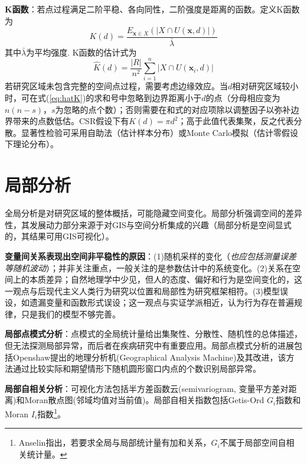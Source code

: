 \par \textbf{K函数}：若点过程满足二阶平稳、各向同性，二阶强度是距离的函数。定义K函数为
\begin{equation}
    K(d)=\frac{E_{\mathbf{x}\in X}(\vert X\cap U(\mathbf{x},d)\vert )}{\bar{\lambda}}
\end{equation}
其中$\bar{\lambda}$为平均强度. K函数的估计式为
\begin{equation}
    \hat{K}(d)=\frac{\vert R \vert}{n^2}\sum_{i=1}^n \vert X\cap U(\mathbf{x}_i,d)\vert
    \label{eq:hatK}
\end{equation}
若研究区域未包含完整的空间点过程，需要考虑边缘效应。当$d$相对研究区域较小时，可在式(\ref{eq:hatK})的求和号中忽略到边界距离小于$d$的点（分母相应变为$n(n-s)$，$s$为忽略的点个数）；否则需要在和式的对应项除以调整因子以弥补边界带来的点数低估。CSR假设下有$K(d)=\pi d^2$；高于此值代表集聚，反之代表分散。显著性检验可采用自助法（估计样本分布）或Monte Carlo模拟（估计零假设下理论分布）。


\section{局部分析}

\par 全局分析是对研究区域的整体概括，可能隐藏空间变化。局部分析强调空间的差异性，其发展动力部分来源于对GIS与空间分析集成的兴趣（局部分析是空间显式的，其结果可用GIS可视化）。

\par \textbf{变量间关系表现出空间非平稳性的原因}：(1)随机采样的变化（\emph{也应包括测量误差等随机波动}）；并非关注重点，一般关注的是参数估计中的系统变化。(2)关系在空间上的本质差异；自然地理学中少见，但人的态度、偏好和行为是空间变化的，这一观点与后现代主义人类行为研究以位置和局部性为研究框架相符。(3)模型误设，如遗漏变量和函数形式误设；这一观点与实证学派相近，认为行为存在普遍规律，只是我们的模型不够完善。

\par \textbf{局部点模式分析}：点模式的全局统计量给出集聚性、分散性、随机性的总体描述，但无法探测局部异常，而后者在疾病研究中有重要应用。局部点模式分析的进展包括Openshaw提出的地理分析机(Geographical Analysis Machine)及其改进，该方法通过比较实际和期望情形下随机圆形窗口内点的个数识别局部异常。

\par \textbf{局部自相关分析}：可视化方法包括半方差函数云(semivariogram, 变量平方差对距离)和Moran散点图(邻域均值对当前值)。局部自相关指数包括Getis-Ord $G_i$指数和Moran $I_i$指数\footnote{Anselin指出，若要求全局与局部统计量有加和关系，$G_i$不属于局部空间自相关统计量。}。

